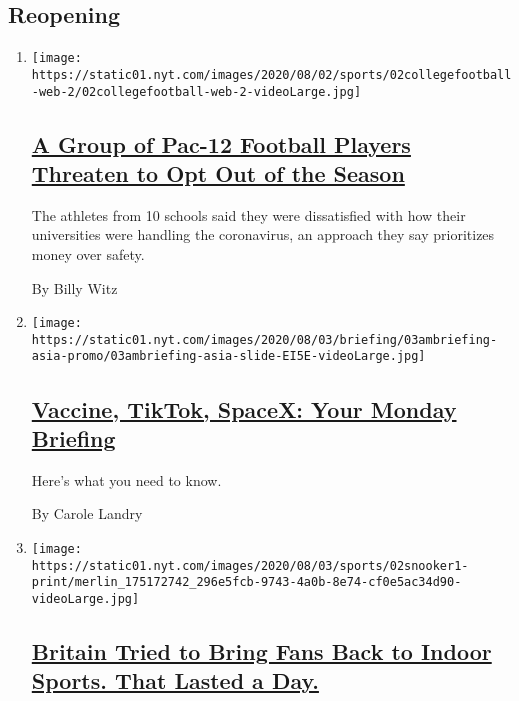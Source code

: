 \hypertarget{reopening}{%
\subsection{Reopening}\label{reopening}}

\begin{enumerate}
\def\labelenumi{\arabic{enumi}.}
\item
  \texttt{[image: https://static01.nyt.com/images/2020/08/02/sports/02collegefootball-web-2/02collegefootball-web-2-videoLarge.jpg]}

  \hypertarget{a-group-of-pac-12-football-players-threaten-to-opt-out-of-the-season}{%
  \subsection{\texorpdfstring{\href{/2020/08/02/sports/ncaafootball/coronavirus-college-football-pac-12.html}{A
  Group of Pac-12 Football Players Threaten to Opt Out of the
  Season}}{A Group of Pac-12 Football Players Threaten to Opt Out of the Season}}\label{a-group-of-pac-12-football-players-threaten-to-opt-out-of-the-season}}

  The athletes from 10 schools said they were dissatisfied with how
  their universities were handling the coronavirus, an approach they say
  prioritizes money over safety.

  By Billy Witz
\item
  \texttt{[image: https://static01.nyt.com/images/2020/08/03/briefing/03ambriefing-asia-promo/03ambriefing-asia-slide-EI5E-videoLarge.jpg]}

  \hypertarget{vaccine-tiktok-spacex-your-monday-briefing}{%
  \subsection{\texorpdfstring{\href{/2020/08/02/briefing/coronavirus-vaccine-india-us-tiktok-spacex.html}{Vaccine,
  TikTok, SpaceX: Your Monday
  Briefing}}{Vaccine, TikTok, SpaceX: Your Monday Briefing}}\label{vaccine-tiktok-spacex-your-monday-briefing}}

  Here's what you need to know.

  By Carole Landry
\item
  \texttt{[image: https://static01.nyt.com/images/2020/08/03/sports/02snooker1-print/merlin\_175172742\_296e5fcb-9743-4a0b-8e74-cf0e5ac34d90-videoLarge.jpg]}

  \hypertarget{britain-tried-to-bring-fans-back-to-indoor-sports-that-lasted-a-day}{%
  \subsection{\texorpdfstring{\href{/2020/08/02/sports/snooker-world-championship.html}{Britain
  Tried to Bring Fans Back to Indoor Sports. That Lasted a
  Day.}}{Britain Tried to Bring Fans Back to Indoor Sports. That Lasted a Day.}}\label{britain-tried-to-bring-fans-back-to-indoor-sports-that-lasted-a-day}}


\end{enumerate}
